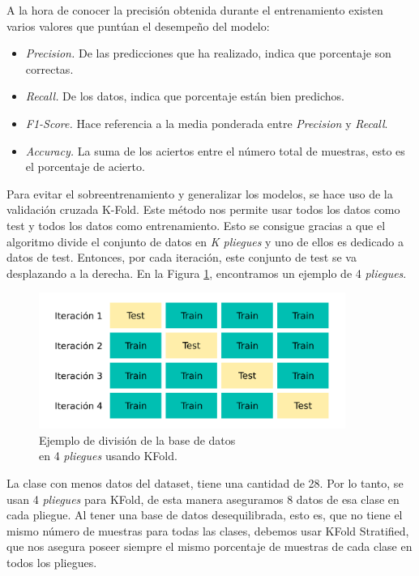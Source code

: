 A la hora de conocer la precisión obtenida durante el entrenamiento existen varios valores que puntúan el desempeño del modelo:

\begin{itemize}
    \item \textit{Precision.} De las predicciones que ha realizado, indica que porcentaje son correctas.
    \item \textit{Recall.} De los datos, indica que porcentaje están bien predichos.
    \item \textit{F1-Score.} Hace referencia a la media ponderada entre \textit{Precision} y \textit{Recall}.
    \item \textit{Accuracy.} La suma de los aciertos entre el número total de muestras, esto es el porcentaje de acierto.\\
\end{itemize}

Para evitar el sobreentrenamiento y generalizar los modelos, se hace uso de la validación cruzada K-Fold. Este método nos permite usar todos los datos como test y todos los datos como entrenamiento. Esto se consigue gracias a que el algoritmo divide el conjunto de datos en \textit{K pliegues} y uno de ellos es dedicado a datos de test. Entonces, por cada iteración, este conjunto de test se va desplazando a la derecha. En la Figura \ref{fig:kfolf_explicacion}, encontramos un ejemplo de 4 \textit{pliegues}.\\

\begin{figure} [h!]
  \begin{center}
    \includegraphics[width=10cm]{figs/KFold_explanation.png}
  \end{center}
  \captionsetup{justification=centering}
  \caption{Ejemplo de división de la base de datos \\
  en 4 \textit{pliegues} usando KFold.}
  \label{fig:kfolf_explicacion}
\end{figure}

La clase con menos datos del dataset, tiene una cantidad de 28. Por lo tanto, se usan 4 \textit{pliegues} para KFold, de esta manera aseguramos 8 datos de esa clase en cada pliegue. Al tener una base de datos desequilibrada, esto es, que no tiene el mismo número de muestras para todas las clases, debemos usar KFold Stratified, que nos asegura poseer siempre el mismo porcentaje de muestras de cada clase en todos los pliegues.\\

